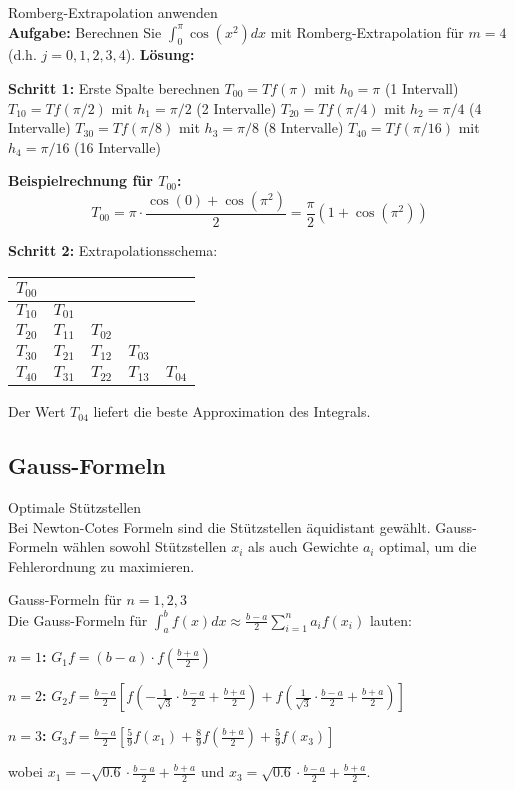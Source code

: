 \begin{example2}{Romberg-Extrapolation anwenden}\\
\textbf{Aufgabe:} Berechnen Sie $\int_0^{\pi} \cos(x^2) dx$ mit Romberg-Extrapolation für $m = 4$ (d.h. $j = 0, 1, 2, 3, 4$).
\tcblower
\textbf{Lösung:}

\textbf{Schritt 1:} Erste Spalte berechnen
$T_{00} = Tf(\pi)$ mit $h_0 = \pi$ (1 Intervall)
$T_{10} = Tf(\pi/2)$ mit $h_1 = \pi/2$ (2 Intervalle)
$T_{20} = Tf(\pi/4)$ mit $h_2 = \pi/4$ (4 Intervalle)
$T_{30} = Tf(\pi/8)$ mit $h_3 = \pi/8$ (8 Intervalle)
$T_{40} = Tf(\pi/16)$ mit $h_4 = \pi/16$ (16 Intervalle)

\textbf{Beispielrechnung für $T_{00}$:}
$$T_{00} = \pi \cdot \frac{\cos(0) + \cos(\pi^2)}{2} = \frac{\pi}{2}(1 + \cos(\pi^2))$$

\textbf{Schritt 2:} Extrapolationsschema:
\begin{center}
\begin{tabular}{|c|c|c|c|c|}
\hline
$T_{00}$ & & & & \\
\hline
$T_{10}$ & $T_{01}$ & & & \\
\hline
$T_{20}$ & $T_{11}$ & $T_{02}$ & & \\
\hline
$T_{30}$ & $T_{21}$ & $T_{12}$ & $T_{03}$ & \\
\hline
$T_{40}$ & $T_{31}$ & $T_{22}$ & $T_{13}$ & $T_{04}$ \\
\hline
\end{tabular}
\end{center}

Der Wert $T_{04}$ liefert die beste Approximation des Integrals.
\end{example2}

\subsection{Gauss-Formeln}

\begin{concept}{Optimale Stützstellen}\\
Bei Newton-Cotes Formeln sind die Stützstellen äquidistant gewählt. Gauss-Formeln wählen sowohl Stützstellen $x_i$ als auch Gewichte $a_i$ optimal, um die Fehlerordnung zu maximieren.
\end{concept}

\begin{theorem}{Gauss-Formeln} für $n = 1, 2, 3$\\
Die Gauss-Formeln für $\int_a^b f(x) dx \approx \frac{b-a}{2} \sum_{i=1}^{n} a_i f(x_i)$ lauten:

\textbf{$n = 1$:} $G_1f = (b-a) \cdot f\left(\frac{b+a}{2}\right)$

\textbf{$n = 2$:} $G_2f = \frac{b-a}{2}\left[f\left(-\frac{1}{\sqrt{3}} \cdot \frac{b-a}{2} + \frac{b+a}{2}\right) + f\left(\frac{1}{\sqrt{3}} \cdot \frac{b-a}{2} + \frac{b+a}{2}\right)\right]$

\textbf{$n = 3$:} $G_3f = \frac{b-a}{2}\left[\frac{5}{9}f(x_1) + \frac{8}{9}f\left(\frac{b+a}{2}\right) + \frac{5}{9}f(x_3)\right]$

wobei $x_1 = -\sqrt{0.6} \cdot \frac{b-a}{2} + \frac{b+a}{2}$ und $x_3 = \sqrt{0.6} \cdot \frac{b-a}{2} + \frac{b+a}{2}$.
\end{theorem}

